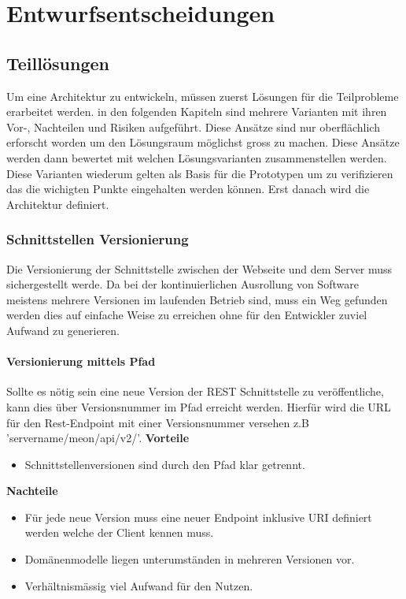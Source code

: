 \label{entwurfsentscheidungen}

\chapter{Entwurfsentscheidungen}

\section{Teillösungen}

Um eine Architektur zu entwickeln, müssen zuerst Lösungen für die Teilprobleme erarbeitet werden. in den folgenden Kapiteln sind mehrere Varianten mit ihren Vor-, Nachteilen und Risiken aufgeführt. Diese Ansätze sind nur oberflächlich erforscht worden um den Lösungsraum möglichst gross zu machen. Diese Ansätze werden dann bewertet mit welchen Lösungsvarianten zusammenstellen werden. Diese Varianten wiederum gelten als Basis für die Prototypen um zu verifizieren das die wichigten Punkte eingehalten werden können. Erst danach wird die Architektur definiert.

\subsection{Schnittstellen Versionierung}

Die Versionierung der Schnittstelle zwischen der Webseite und dem Server muss sichergestellt werde. Da bei der kontinuierlichen Ausrollung von Software meistens mehrere Versionen im laufenden Betrieb sind, muss ein Weg gefunden werden dies auf einfache Weise zu erreichen ohne für den Entwickler zuviel Aufwand zu generieren.

\subsubsection{Versionierung mittels Pfad}

Sollte es nötig sein eine neue Version der \Gls{REST} Schnittstelle zu veröffentliche, kann dies über Versionsnummer im Pfad erreicht werden. Hierfür wird die URL für den Rest-Endpoint mit einer Versionsnummer versehen z.B 'servername/meon/api/v2/'.
\newline
\newline
\textbf{Vorteile}
\begin{itemize}
	\item Schnittstellenversionen sind durch den Pfad klar getrennt.
\end{itemize}
\textbf{Nachteile}
\begin{itemize}
	\item Für jede neue Version muss eine neuer Endpoint inklusive URI definiert werden welche der Client kennen muss.
	\item Domänenmodelle liegen unterumständen in mehreren Versionen vor.
	\item Verhältnismässig viel Aufwand für den Nutzen.
\end{itemize}

